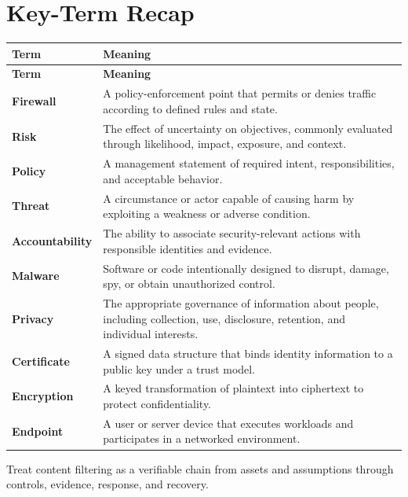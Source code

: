 \documentclass[11pt]{article}
\begin{document}
\section*{Key-Term Recap}
\begin{longtable}{>{\RaggedRight\arraybackslash}p{}>{\RaggedRight\arraybackslash}p{}}
\toprule\rowcolor{Navy}\color{white}\textbf{Term} & \color{white}\textbf{Meaning}\\\midrule
\endfirsthead
\toprule\rowcolor{Navy}\color{white}\textbf{Term} & \color{white}\textbf{Meaning}\\\midrule
\endhead
\textbf{Firewall} & A policy-enforcement point that permits or denies traffic according to defined rules and state. \\\midrule
\textbf{Risk} & The effect of uncertainty on objectives, commonly evaluated through likelihood, impact, exposure, and context. \\\midrule
\textbf{Policy} & A management statement of required intent, responsibilities, and acceptable behavior. \\\midrule
\textbf{Threat} & A circumstance or actor capable of causing harm by exploiting a weakness or adverse condition. \\\midrule
\textbf{Accountability} & The ability to associate security-relevant actions with responsible identities and evidence. \\\midrule
\textbf{Malware} & Software or code intentionally designed to disrupt, damage, spy, or obtain unauthorized control. \\\midrule
\textbf{Privacy} & The appropriate governance of information about people, including collection, use, disclosure, retention, and individual interests. \\\midrule
\textbf{Certificate} & A signed data structure that binds identity information to a public key under a trust model. \\\midrule
\textbf{Encryption} & A keyed transformation of plaintext into ciphertext to protect confidentiality. \\\midrule
\textbf{Endpoint} & A user or server device that executes workloads and participates in a networked environment. \\\midrule
\bottomrule
\end{longtable}
\begin{takeawaybox}
Treat content filtering as a verifiable chain from assets and assumptions through controls, evidence, response, and recovery.
\end{takeawaybox}
\end{document}
